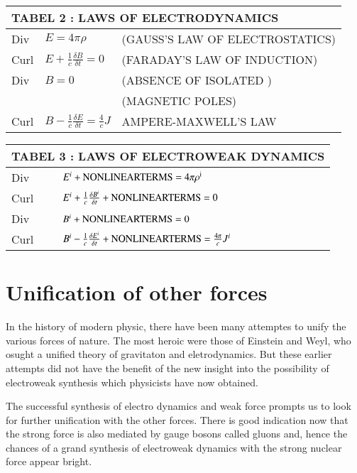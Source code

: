 \begin{center}
\begin{tabular}{llll}
\multicolumn{4}{l}{{\bf TABEL 2 : LAWS OF ELECTRODYNAMICS}}\\
\hline
Div & $E = 4 \pi \rho$ & \multicolumn{2}{l}{(GAUSS'S LAW OF ELECTROSTATICS)}\\
Curl & $E + \frac{1}{c} \frac{\delta B}{\delta t} =0$ & \multicolumn{2}{l}{(FARADAY'S LAW OF INDUCTION)}\\
Div & $B = 0$ & \multicolumn{2}{l}{(ABSENCE OF ISOLATED )}\\
    &         & \multicolumn{2}{l}{(MAGNETIC POLES)}\\
Curl & $B-\frac{1}{c} \frac{\delta  E}{\delta t} = \frac{4}{c} J$ & \multicolumn{2}{l}{AMPERE-MAXWELL'S LAW}\\
\hline
\end{tabular}
\end{center}

 
\begin{center}
\begin{tabular}{llll}
\multicolumn{4}{l}{{\bf TABEL 3 : LAWS OF ELECTROWEAK DYNAMICS}}\\
\hline
Div & \multicolumn{3}{l}{$E^{i} + {\rm NONLINEAR TERMS = 4\pi \rho^{i}}$}\\
Curl & \multicolumn{3}{l}{$E^{i} + \frac{1}{c} \frac{\delta B^{i}}{\delta t} + {\rm NONLINEAR TERMS} = 0$ } \\
Div & \multicolumn{3}{l}{$B^{i} +  {\rm NONLINEAR TERMS} = 0$} \\
Curl & \multicolumn{3}{l}{$B^{i} - \frac{1}{c} \frac{\delta E^{i}}{\delta t} + {\rm NONLINEAR TERMS} = \frac{4\pi}{c} J^{i} $} \\
\hline
\end{tabular}
\end{center}

\section*{Unification of other forces}

In the history of modern physic, there have been many attemptes to unify the various forces of nature. The most heroic were those of Einstein and Weyl, who osught a unified theory of gravitaton and eletrodynamics. But these earlier attempts did not have the benefit of the new insight into the possibility of electroweak synthesis which physicists have now obtained.

The successful synthesis of electro dynamics and weak force prompts us to look for further unification with the other forces. There is good indication now that the strong force is also mediated by gauge bosons called gluons and, hence the chances of a grand synthesis of electroweak dynamics with the strong nuclear force appear bright.

